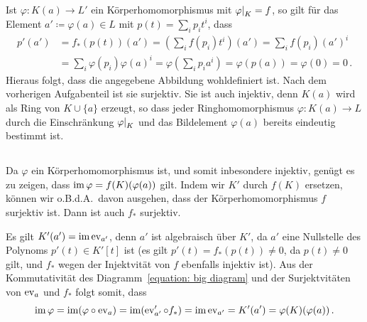 \subsection{}

Ist $\varphi \colon K(a) \to L'$ ein Körperhomomorphismus mit $\restrict{\varphi}{K} = f$, so gilt für das Element $a' \coloneqq \varphi(a) \in L$ mit $p(t) = \sum_i p_i t^i$, dass
\begin{align*}
      p'(a')
  &=  f_*( p(t) )( a' )
   =  \left( \sum_i f(p_i) t^i \right)( a' )
   =  \sum_i f(p_i) (a')^i
  \\
  &=  \sum_i \varphi(p_i) \varphi(a)^i
   =  \varphi\left( \sum_i p_i a^i \right)
   =  \varphi( p(a) )
   =  \varphi(0)
   =   0 \,.
\end{align*}
Hieraus folgt, dass die angegebene Abbildung wohldefiniert ist.
Nach dem vorherigen Aufgabenteil ist sie surjektiv.
Sie ist auch injektiv, denn $K(a)$ wird als Ring von $K \cup \{a\}$ erzeugt, so dass jeder Ringhomomorphismus $\varphi \colon K(a) \to L$ durch die Einschränkung $\restrict{\varphi}{K}$ und das Bildelement $\varphi(a)$ bereits eindeutig bestimmt ist.





\subsection{}

Da $\varphi$ ein Körperhomomorphismus ist, und somit inbesondere injektiv, genügt es zu zeigen, dass $\operatorname{im} \varphi = f(K)(\varphi(a))$ gilt.
Indem wir $K'$ durch $f(K)$ ersetzen, können wir o.B.d.A.\ davon ausgehen, dass der Körperhomomorphismus $f$ surjektiv ist.
Dann ist auch $f_*$ surjektiv.

Es gilt $K'(a') = \operatorname{im} \operatorname{ev}_{a'}$, denn $a'$ ist algebraisch über $K'$, da $a'$ eine Nullstelle des Polynoms $p'(t) \in K'[t]$ ist (es gilt $p'(t) = f_*(p(t)) \neq 0$, da $p(t) \neq 0$ gilt, und $f_*$ wegen der Injektvität von $f$ ebenfalls injektiv ist).
Aus der Kommutativität des Diagramm~\eqref{equation: big diagram} und der Surjektvitäten von $\operatorname{ev}_a$ und $f_*$ folgt somit, dass
\[
    \operatorname{im} \varphi
  = \operatorname{im} (\varphi \circ \operatorname{ev}_a)
  = \operatorname{im} (\operatorname{ev}_{a'}' \circ f_*)
  = \operatorname{im} \operatorname{ev}_{a'}
  = K'(a')
  = \varphi(K)(\varphi(a)) \,.
\]





